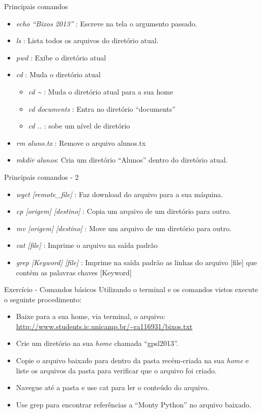 \documentclass{beamer}
\begin{document}
\begin{frame}{Principais comandos}
   \begin{itemize}
   \item \emph{echo ``Bixos 2013''} : Escreve na tela o argumento passado.
   \item \emph{ls} : Lista todos os arquivos do diretório atual.
   \item \emph{pwd} : Exibe o diretório atual
   \item \emph{cd} : Muda o diretório atual
     \begin{itemize}
     \item \emph{cd \~{}} : Muda o diretório atual para a sua home
     \item \emph{cd documents} : Entra no diretório ``documents''
     \item \emph{cd ..} : sobe um nível de diretório
     \end{itemize}
   \item \emph{rm aluno.tx} : Remove o arquivo alunos.tx
   \item \emph{mkdir alunos}: Cria um diretório ``Alunos'' dentro do
     diretório atual.
   \end{itemize}
\end{frame}

\begin{frame}{Principais comandos - 2}
   \begin{itemize}
   \item \emph{wget [remote\_file]} : Faz download do arquivo para a sua
     máquina.
   \item \emph{cp [origem] [destino]} : Copia um arquivo de um diretório para
     outro.
   \item \emph{mv [origem] [destino]} : Move um arquivo de um diretório para
     outro.
   \item \emph{cat [file]} : Imprime o arquivo na saída padrão
   \item \emph{grep [Keyword] [file]} : Imprime na saída padrão as linhas do
     arquivo [file] que contém as palavras chaves [Keyword]
   \end{itemize}
\end{frame}


\begin{frame}{Exercício - Comandos básicos}
  Utilizando o terminal e os comandos vistos execute o seguinte procedimento:
  \begin{itemize}
  \item Baixe para a sua home, via terminal, o arquivo:
    \url{http://www.students.ic.unicamp.br/\~ra116931/bixos.txt}
  \item Crie um diretório na sua \emph{home} chamada ``gpsl2013''.
  \item Copie o arquivo baixado para dentro da pasta recém-criada na sua
    \emph{home} e liste os arquivos da pasta para verificar que o arquivo foi
    criado.
  \item Navegue até a pasta e use cat para ler o conteúdo do arquivo.
  \item Use grep para encontrar referências a ``Monty Python'' no arquivo
    baixado.
  \end{itemize}
\end{frame}
\end{document}
